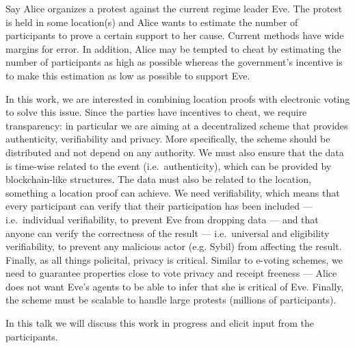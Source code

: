 Say Alice organizes a protest against the current regime leader Eve.
The protest is held in some location(s) and Alice wants to estimate the number 
of participants to prove a certain support to her cause.
Current methods have wide margins for error.
In addition, Alice may be tempted to cheat by estimating the number of 
participants as high as possible whereas the government's incentive is to make 
this estimation as low as possible to support Eve.
                                                                                  
In this work, we are interested in combining location proofs with electronic 
voting to solve this issue.
Since the parties have incentives to cheat, we require transparency: in 
particular we are aiming at a decentralized scheme that provides authenticity, 
verifiability and privacy.
More specifically, the scheme should be distributed and not depend on any 
authority.
We must also ensure that the data is time-wise related to the event (i.e.\ 
authenticity), which can be provided by blockchain-like structures.
The data must also be related to the location, something a location proof can 
achieve.
We need verifiability, which means that every participant can verify that their 
participation has been included --- i.e.\ individual verifiability, to prevent 
Eve from dropping data --- and that anyone can verify the correctness of the 
result --- i.e.\ universal and eligibility verifiability, to prevent any 
malicious actor (e.g. Sybil) from affecting the result.
Finally, as all things policital, privacy is critical.
Similar to e-voting schemes, we need to guarantee properties close to vote 
privacy and receipt freeness --- Alice does not want Eve's agents to be able to 
infer that she is critical of Eve.
Finally, the scheme must be scalable to handle large protests (millions of 
participants).

In this talk we will discuss this work in progress and elicit input from the 
participants.

